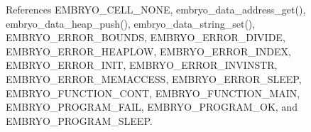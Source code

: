 References EMBRYO\_\-CELL\_\-NONE, embryo\_\-data\_\-address\_\-get(), embryo\_\-data\_\-heap\_\-push(), embryo\_\-data\_\-string\_\-set(), EMBRYO\_\-ERROR\_\-BOUNDS, EMBRYO\_\-ERROR\_\-DIVIDE, EMBRYO\_\-ERROR\_\-HEAPLOW, EMBRYO\_\-ERROR\_\-INDEX, EMBRYO\_\-ERROR\_\-INIT, EMBRYO\_\-ERROR\_\-INVINSTR, EMBRYO\_\-ERROR\_\-MEMACCESS, EMBRYO\_\-ERROR\_\-SLEEP, EMBRYO\_\-FUNCTION\_\-CONT, EMBRYO\_\-FUNCTION\_\-MAIN, EMBRYO\_\-PROGRAM\_\-FAIL, EMBRYO\_\-PROGRAM\_\-OK, and EMBRYO\_\-PROGRAM\_\-SLEEP.